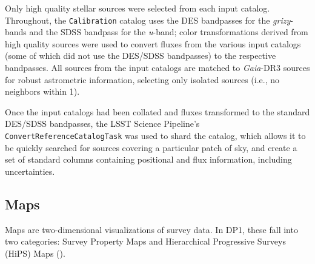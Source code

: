 \begin{itemize}
Only high quality stellar sources were selected from each input catalog. Throughout, the \texttt{Calibration} catalog uses the DES bandpasses for the \textit{grizy}-bands and the \gls{SDSS} bandpass for the \textit{u}-band; color transformations derived from high quality sources were used to convert fluxes from the various input catalogs (some of which did not use the DES/SDSS bandpasses) to the respective bandpasses. All sources from the input catalogs are matched to \textit{Gaia}-DR3 sources for robust astrometric information, selecting only isolated sources (i.e., no neighbors within 1\arcsec).

Once the input catalogs had been collated and fluxes transformed to the standard DES/SDSS bandpasses, the LSST Science Pipeline's \texttt{ConvertReferenceCatalogTask} was used to shard the catalog, which allows it to be quickly searched for sources covering a particular patch of sky, and create a set of standard columns containing positional and \gls{flux} information, including uncertainties.


\end{itemize}





\subsection{Maps}
Maps are two-dimensional visualizations of survey data. In \gls{DP1}, these fall into two categories: Survey Property Maps and Hierarchical Progressive Surveys (HiPS) Maps (\citealt{2015A&A...578A.114F}).

